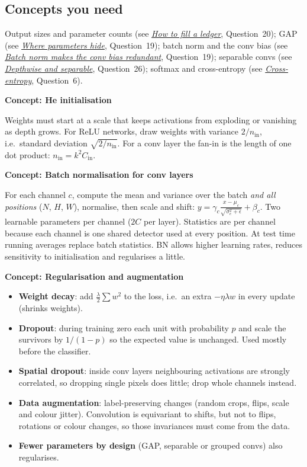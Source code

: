 \documentclass[12pt,a4paper]{article}
\newcommand{\concept}[2]{\par\medskip\phantomsection\label{#1}{\large\bfseries\color{blue!50!black} Concept: #2}\par}
\newcommand{\seeconcept}[3]{(see \hyperref[#1]{\textit{#2}}, Question~#3)}
\begin{document}
\subsection*{Concepts you need}
Output sizes and parameter counts \seeconcept{c:ledger}{How to fill a ledger}{20}; GAP \seeconcept{c:gap}{Where parameters hide}{19}; batch norm and the conv bias \seeconcept{c:bn}{Batch norm makes the conv bias redundant}{19}; separable convs \seeconcept{c:depthwise}{Depthwise and separable}{26}; softmax and cross-entropy \seeconcept{c:ce}{Cross-entropy}{6}.

\concept{c:heinit}{He initialisation}
Weights must start at a scale that keeps activations from exploding or vanishing as depth grows. For ReLU networks, draw weights with variance $2/n_{\text{in}}$, i.e.\ standard deviation $\sqrt{2/n_{\text{in}}}$. For a conv layer the fan-in is the length of one dot product: $n_{\text{in}}=k^2C_{\text{in}}$.

\concept{c:bnconv}{Batch normalisation for conv layers}
For each channel $c$, compute the mean and variance over the batch \emph{and all positions} ($N$, $H$, $W$), normalise, then scale and shift: $y=\gamma_c\frac{x-\mu_c}{\sqrt{\sigma_c^2+\epsilon}}+\beta_c$. Two learnable parameters per channel ($2C$ per layer). Statistics are per channel because each channel is one shared detector used at every position. At test time running averages replace batch statistics. BN allows higher learning rates, reduces sensitivity to initialisation and regularises a little.

\concept{c:regularise}{Regularisation and augmentation}
\begin{itemize}[nosep]
\item \textbf{Weight decay}: add $\tfrac\lambda2\sum w^2$ to the loss, i.e.\ an extra $-\eta\lambda w$ in every update (shrinks weights).
\item \textbf{Dropout}: during training zero each unit with probability $p$ and scale the survivors by $1/(1-p)$ so the expected value is unchanged. Used mostly before the classifier.
\item \textbf{Spatial dropout}: inside conv layers neighbouring activations are strongly correlated, so dropping single pixels does little; drop whole channels instead.
\item \textbf{Data augmentation}: label-preserving changes (random crops, flips, scale and colour jitter). Convolution is equivariant to shifts, but not to flips, rotations or colour changes, so those invariances must come from the data.
\item \textbf{Fewer parameters by design} (GAP, separable or grouped convs) also regularises.
\end{itemize}
\end{document}
